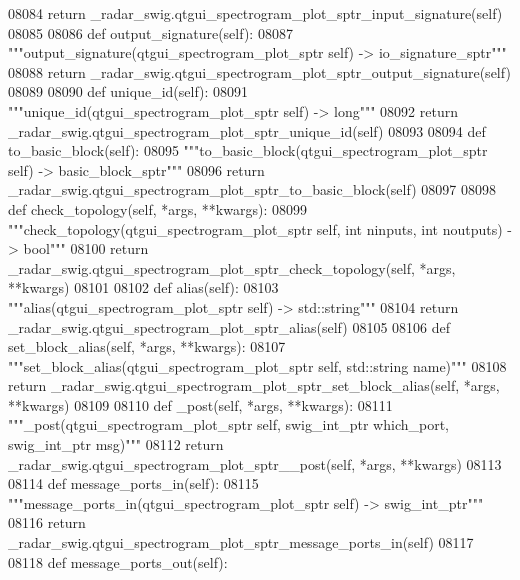 \begin{DoxyCode}
{{{{{{{{{{{{{{{{{{{{{{{{{{08084         \textcolor{keywordflow}{return} \_radar\_swig.qtgui\_spectrogram\_plot\_sptr\_input\_signature(self)
08085 
08086     \textcolor{keyword}{def }output_signature(self):
08087         \textcolor{stringliteral}{"""output\_signature(qtgui\_spectrogram\_plot\_sptr self) -> io\_signature\_sptr"""}
08088         \textcolor{keywordflow}{return} \_radar\_swig.qtgui\_spectrogram\_plot\_sptr\_output\_signature(self)
08089 
08090     \textcolor{keyword}{def }unique_id(self):
08091         \textcolor{stringliteral}{"""unique\_id(qtgui\_spectrogram\_plot\_sptr self) -> long"""}
08092         \textcolor{keywordflow}{return} \_radar\_swig.qtgui\_spectrogram\_plot\_sptr\_unique\_id(self)
08093 
08094     \textcolor{keyword}{def }to_basic_block(self):
08095         \textcolor{stringliteral}{"""to\_basic\_block(qtgui\_spectrogram\_plot\_sptr self) -> basic\_block\_sptr"""}
08096         \textcolor{keywordflow}{return} \_radar\_swig.qtgui\_spectrogram\_plot\_sptr\_to\_basic\_block(self)
08097 
08098     \textcolor{keyword}{def }check_topology(self, *args, **kwargs):
08099         \textcolor{stringliteral}{"""check\_topology(qtgui\_spectrogram\_plot\_sptr self, int ninputs, int noutputs) -> bool"""}
08100         \textcolor{keywordflow}{return} \_radar\_swig.qtgui\_spectrogram\_plot\_sptr\_check\_topology(self, *args, **kwargs)
08101 
08102     \textcolor{keyword}{def }alias(self):
08103         \textcolor{stringliteral}{"""alias(qtgui\_spectrogram\_plot\_sptr self) -> std::string"""}
08104         \textcolor{keywordflow}{return} \_radar\_swig.qtgui\_spectrogram\_plot\_sptr\_alias(self)
08105 
08106     \textcolor{keyword}{def }set_block_alias(self, *args, **kwargs):
08107         \textcolor{stringliteral}{"""set\_block\_alias(qtgui\_spectrogram\_plot\_sptr self, std::string name)"""}
08108         \textcolor{keywordflow}{return} \_radar\_swig.qtgui\_spectrogram\_plot\_sptr\_set\_block\_alias(self, *args, **kwargs)
08109 
08110     \textcolor{keyword}{def }_post(self, *args, **kwargs):
08111         \textcolor{stringliteral}{"""\_post(qtgui\_spectrogram\_plot\_sptr self, swig\_int\_ptr which\_port, swig\_int\_ptr msg)"""}
08112         \textcolor{keywordflow}{return} \_radar\_swig.qtgui\_spectrogram\_plot\_sptr\_\_post(self, *args, **kwargs)
08113 
08114     \textcolor{keyword}{def }message_ports_in(self):
08115         \textcolor{stringliteral}{"""message\_ports\_in(qtgui\_spectrogram\_plot\_sptr self) -> swig\_int\_ptr"""}
08116         \textcolor{keywordflow}{return} \_radar\_swig.qtgui\_spectrogram\_plot\_sptr\_message\_ports\_in(self)
08117 
08118     \textcolor{keyword}{def }message_ports_out(self):
}}}}}}}}}}}}}}}}}}}}}}}}}}
\end{DoxyCode}
